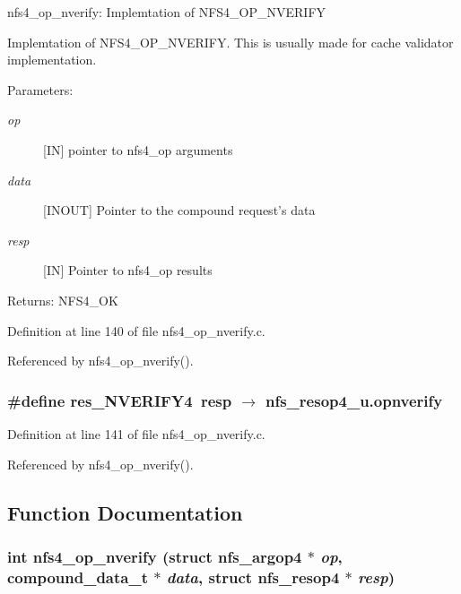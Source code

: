 nfs4\_\-op\_\-nverify: Implemtation of NFS4\_\-OP\_\-NVERIFY

Implemtation of NFS4\_\-OP\_\-NVERIFY. This is usually made for cache validator implementation.

\begin{Desc}
\item[Parameters:]
\begin{description}
\item[{\em op}][IN] pointer to nfs4\_\-op arguments \item[{\em data}][INOUT] Pointer to the compound request's data \item[{\em resp}][IN] Pointer to nfs4\_\-op results\end{description}
\end{Desc}
\begin{Desc}
\item[Returns:]NFS4\_\-OK \end{Desc}


Definition at line 140 of file nfs4\_\-op\_\-nverify.c.

Referenced by nfs4\_\-op\_\-nverify().
\subsubsection{\setlength{\rightskip}{0pt plus 5cm}\#define res\_\-NVERIFY4\ resp $\rightarrow$ nfs\_\-resop4\_\-u.opnverify}\label{nfs4__op__nverify_8c_a1}




Definition at line 141 of file nfs4\_\-op\_\-nverify.c.

Referenced by nfs4\_\-op\_\-nverify().

\subsection{Function Documentation}
\subsubsection{\setlength{\rightskip}{0pt plus 5cm}int nfs4\_\-op\_\-nverify (struct nfs\_\-argop4 $\ast$ {\em op}, compound\_\-data\_\-t $\ast$ {\em data}, struct nfs\_\-resop4 $\ast$ {\em resp})}\label{nfs4__op__nverify_8c_a2}





